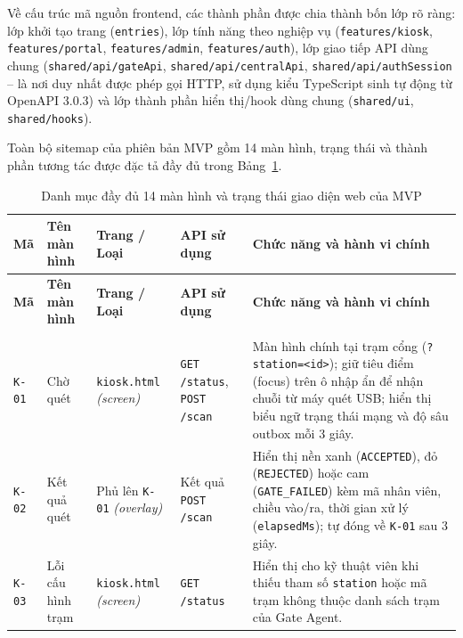 Về cấu trúc mã nguồn frontend, các thành phần được chia thành bốn lớp rõ ràng: lớp khởi tạo trang
(\texttt{entries}), lớp tính năng theo nghiệp vụ (\texttt{features/kiosk}, \texttt{features/portal},
\texttt{features/admin}, \texttt{features/auth}), lớp giao tiếp API dùng chung
(\texttt{shared/api/gateApi}, \texttt{shared/api/centralApi}, \texttt{shared/api/authSession} -- là
nơi duy nhất được phép gọi HTTP, sử dụng kiểu TypeScript sinh tự động từ OpenAPI 3.0.3) và lớp thành
phần hiển thị/hook dùng chung (\texttt{shared/ui}, \texttt{shared/hooks}).

Toàn bộ sitemap của phiên bản MVP gồm 14 màn hình, trạng thái và thành phần tương tác được đặc tả đầy
đủ trong Bảng~\ref{tab:web-sitemap-catalog}.

\small
\begin{longtable}{|>{\raggedright\arraybackslash}p{1.2cm}|>{\raggedright\arraybackslash}p{2.4cm}|>{\raggedright\arraybackslash}p{2.4cm}|>{\raggedright\arraybackslash}p{3.0cm}|>{\raggedright\arraybackslash}p{5.6cm}|}
\caption{Danh mục đầy đủ 14 màn hình và trạng thái giao diện web của MVP}\label{tab:web-sitemap-catalog}\\
\hline
\textbf{Mã} & \textbf{Tên màn hình} & \textbf{Trang / Loại} & \textbf{API sử dụng} & \textbf{Chức năng và hành vi chính} \\
\hline
\endfirsthead
\hline
\textbf{Mã} & \textbf{Tên màn hình} & \textbf{Trang / Loại} & \textbf{API sử dụng} & \textbf{Chức năng và hành vi chính} \\
\hline
\endhead
\hline
\multicolumn{5}{r}{\textit{Còn tiếp sang trang sau...}} \\
\hline
\endfoot
\hline
\endlastfoot
\texttt{K-01} & Chờ quét & \texttt{kiosk.html} \textit{(screen)} & \texttt{GET /status}, \texttt{POST /scan} & Màn hình chính tại trạm cổng (\texttt{?station=<id>}); giữ tiêu điểm (focus) trên ô nhập ẩn để nhận chuỗi từ máy quét USB; hiển thị biểu ngữ trạng thái mạng và độ sâu outbox mỗi 3 giây. \\
\hline
\texttt{K-02} & Kết quả quét & Phủ lên \texttt{K-01} \textit{(overlay)} & Kết quả \texttt{POST /scan} & Hiển thị nền xanh (\texttt{ACCEPTED}), đỏ (\texttt{REJECTED}) hoặc cam (\texttt{GATE\_FAILED}) kèm mã nhân viên, chiều vào/ra, thời gian xử lý (\texttt{elapsedMs}); tự đóng về \texttt{K-01} sau 3 giây. \\
\hline
\texttt{K-03} & Lỗi cấu hình trạm & \texttt{kiosk.html} \textit{(screen)} & \texttt{GET /status} & Hiển thị cho kỹ thuật viên khi thiếu tham số \texttt{station} hoặc mã trạm không thuộc danh sách trạm của Gate Agent. \\

\end{longtable}
